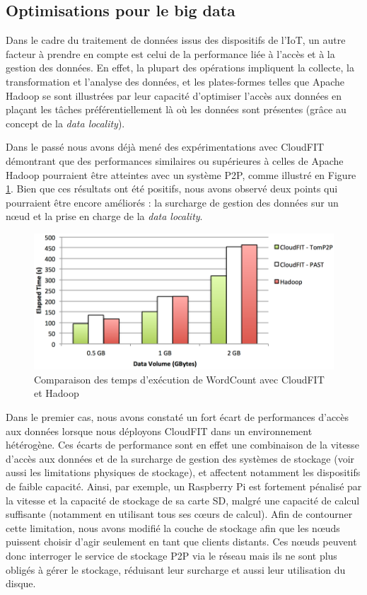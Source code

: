\subsection{Optimisations pour le big data}
%
Dans le cadre du traitement de données issus des dispositifs de l'IoT, un autre facteur à prendre en compte est celui de la performance liée à l'accès et à la gestion des données. En effet, la plupart des opérations impliquent la collecte, la transformation et l'analyse des données, et les plates-formes telles que Apache Hadoop se sont illustrées par leur capacité d'optimiser l'accès aux données en plaçant les tâches préférentiellement là où les données sont présentes (grâce au concept de la \textit{data locality}). 

Dans le passé \cite{Steffenel2015Roma} nous avons déjà mené des expérimentations avec CloudFIT démontrant que des performances similaires ou supérieures à celles de Apache Hadoop pourraient être atteintes avec un système P2P, comme illustré en Figure \ref{fig:Hadoop}. Bien que ces résultats ont été positifs, nous avons observé deux points qui pourraient être encore améliorés : la surcharge de gestion des données sur un n{\oe}ud et la prise en charge de la \textit{data locality}. 

\begin{figure}[!ht]
	\centering
	\includegraphics[width=0.5\linewidth]{img/CloudFIT-mesures.pdf}
	\caption{Comparaison des temps d'exécution de WordCount avec CloudFIT et Hadoop}
	\label{fig:Hadoop}
\end{figure}

Dans le premier cas, nous avons constaté un fort écart de performances d'accès aux données lorsque nous déployons CloudFIT  dans un environnement hétérogène. Ces écarts de performance sont en effet une combinaison de la vitesse d'accès aux données et de la surcharge de gestion des systèmes de stockage (voir aussi les limitations physiques de stockage), et affectent notamment les dispositifs de faible capacité. Ainsi, par exemple, un Raspberry Pi est fortement pénalisé par la vitesse et la capacité de stockage de sa carte SD, malgré une capacité de calcul suffisante (notamment en utilisant tous ses c{\oe}urs de calcul).  Afin de contourner cette limitation, nous avons modifié la couche de stockage afin que les n{\oe}uds puissent choisir d'agir seulement en tant que clients distants. Ces n{\oe}uds peuvent donc interroger le service de stockage P2P via le réseau mais ils ne sont plus obligés à gérer le stockage, réduisant leur surcharge et aussi leur utilisation du disque.

